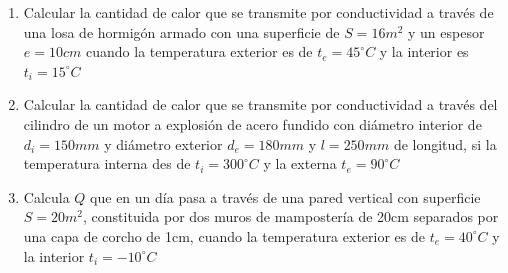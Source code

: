 \documentclass[../main]{subfiles}
\begin{document}
\begin{enumerate}
{      Siendo:

      $Q$: Cantidad de calor. [Kcal]

      $Ct$: Coeficiente térmico.

      $S$: Superficie. [$m^2$]

      $t_1-t_2$: Variación de temperatura. [$^\circ C$]

      $\Delta t$: tiempo [s]

      $e$: Espesor [metros]
    }

  \item Calcular la cantidad de calor que se transmite por
    conductividad a través de una losa de hormigón armado con una
    superficie de $S=16m^2$ y un espesor $e=10cm$ cuando la
    temperatura exterior es de $t_e=45^\circ C$ y la interior es
    $t_i=15^\circ C$
  \item Calcular la cantidad de calor que se transmite por
    conductividad a través del cilindro de un motor a explosión de
    acero fundido con diámetro interior de $d_i=150mm$ y diámetro
    exterior $d_e=180mm$ y $l=250mm$ de longitud, si la temperatura
    interna des de $t_i=300^\circ C$ y la externa $t_e= 90^\circ C$
  \item Calcula $Q$ que en un día pasa a través de una pared vertical
    con superficie $S=20m^2$, constituida por dos muros de
    mampostería de 20cm separados por una capa de corcho de 1cm,
    cuando la temperatura exterior es de $t_e=40^\circ C$ y la
    interior $t_i=-10^\circ C$

\end{enumerate}
\end{document}
